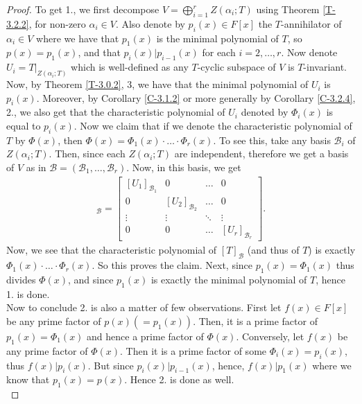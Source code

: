 \documentclass[letterpaper,11pt,twoside]{article}
\theoremstyle{definition}
\theoremstyle{definition}
\theoremstyle{definition}
\theoremstyle{definition}
\theoremstyle{definition}
\theoremstyle{definition}
\theoremstyle{remark}
\theoremstyle{definition}
\newcommand{\rest}[2]{\left. { #1 }\right \vert_{#2}}
\begin{document}
    \begin{proof}
    	To get 1., we first decompose $ V = \bigoplus_{i=1}^{r}Z(\alpha_{i};T)$ using Theorem \ref{T-3.2.2}, for non-zero $ \alpha_i \in V $. Also denote by $ p_i(x) \in F[x]$ the $ T $-annihilator of $ \alpha_i \in V$ where we have that $ p_1(x) $ is the minimal polynomial of $ T $, so $ p(x) = p_1(x) $, and that $ p_i(x) | p_{i-1}(x) $ for each $ i=2,\dots, r $. Now denote $ U_i = \rest{T}{Z(\alpha_i;T)} $ which is well-defined as any $ T $-cyclic subspace of $ V $ is $ T $-invariant. Now, by Theorem \ref{T-3.0.2}, 3, we have that the minimal polynomial of $ U_i $ is $ p_i(x) $. Moreover, by Corollary \ref{C-3.1.2} or more generally by Corollary \ref{C-3.2.4}, 2., we also get that the characteristic polynomial of $ U_i $ denoted by $ \Phi_i(x) $ is equal to $ p_i(x) $. Now we claim that if we denote the characteristic polynomial of $ T $ by $ \Phi(x) $, then $ \Phi(x) = \Phi_1(x) \cdot \dots \cdot \Phi_r(x) $. To see this, take any basis $ \mathcal{B}_{i} $ of $ Z(\alpha_{i};T) $. Then, since each $ Z(\alpha_{i};T) $ are independent, therefore we get a basis of $ V $ as in $ \mathcal{B} = (\mathcal{B}_1,\dots, \mathcal{B}_r) $. Now, in this basis, we get
    	\begin{align*}
    		[T]_{\mathcal{B}} = \begin{bmatrix}
    			[U_1]_{\mathcal{B}_1} & 0 &\dots & 0\\
    			0 & [U_2]_{\mathcal{B}_2} & \dots & 0\\
    			\vdots & \vdots &\ddots & \vdots \\
    			0 & 0 & \dots & 	[U_r]_{\mathcal{B}_r}
    		\end{bmatrix}.
    	\end{align*}
    Now, we see that the characteristic polynomial of $ [T]_{\mathcal{B}} $ (and thus of $ T $) is exactly $ \Phi_{1}(x) \cdot \dots \cdot \Phi_{r}(x) $. So this proves the claim. Next, since $ p_1(x) = \Phi_1(x) $ thus divides $ \Phi(x) $, and since $ p_1(x) $ is exactly the minimal polynomial of $ T $, hence 1. is done.\\
    
    Now to conclude 2. is also a matter of few observations. First let $ f(x)\in F[x] $ be any prime factor of $ p(x) (=p_1(x))$. Then, it is a prime factor of $ p_1(x) = \Phi_1(x) $ and hence a prime factor of $ \Phi(x) $. Conversely, let $ f(x) $ be any prime factor of $ \Phi(x) $. Then it is a prime factor of some $ \Phi_i(x) = p_i(x)$, thus $ f(x) | p_i(x) $. But since $ p_i(x)| p_{i-1}(x) $, hence, $ f(x)|p_1(x) $ where we know that $ p_1(x) = p(x) $. Hence 2. is done as well.\\
    

\end{proof}
\end{document}
